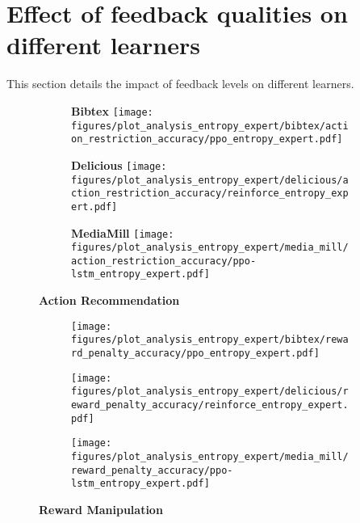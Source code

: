 
\section{Effect of feedback qualities on different learners}
\label{sec:app_expert_quality_perf}

This section details the impact of feedback levels on different learners.
\begin{figure}[!thb]
    \centering
    
    \begin{subfigure}[b]{0.3\columnwidth}
        \centering
        \setlength{\fboxsep}{1pt}\colorbox{lightgray!30}{\textbf{Bibtex}}
        \texttt{[image: figures/plot\_analysis\_entropy\_expert/bibtex/action\_restriction\_accuracy/ppo\_entropy\_expert.pdf]}
     
    \end{subfigure}
    \hfill
    \begin{subfigure}[b]{0.3\columnwidth}
        \centering
        \setlength{\fboxsep}{1pt}\colorbox{lightgray!30}{\textbf{Delicious}}
        \texttt{[image: figures/plot\_analysis\_entropy\_expert/delicious/action\_restriction\_accuracy/reinforce\_entropy\_expert.pdf]}
       
    \end{subfigure}
    \hfill
    \begin{subfigure}[b]{0.3\columnwidth}
        \centering
        \setlength{\fboxsep}{1pt}\colorbox{lightgray!30}{\textbf{MediaMill}}
        \texttt{[image: figures/plot\_analysis\_entropy\_expert/media\_mill/action\_restriction\_accuracy/ppo-lstm\_entropy\_expert.pdf]}
       
    \end{subfigure}
    \setlength{\fboxsep}{1pt}\colorbox{lightgray!30}{\textbf{Action Recommendation}}
    \vspace{1em} %
    
    \begin{subfigure}[b]{0.3\columnwidth}
        \centering
        \texttt{[image: figures/plot\_analysis\_entropy\_expert/bibtex/reward\_penalty\_accuracy/ppo\_entropy\_expert.pdf]}
    \end{subfigure}
    \hfill
    \begin{subfigure}[b]{0.3\columnwidth}
        \centering
        \texttt{[image: figures/plot\_analysis\_entropy\_expert/delicious/reward\_penalty\_accuracy/reinforce\_entropy\_expert.pdf]}
    \end{subfigure}
    \hfill
    \begin{subfigure}[b]{0.3\columnwidth}
        \centering
        \texttt{[image: figures/plot\_analysis\_entropy\_expert/media\_mill/reward\_penalty\_accuracy/ppo-lstm\_entropy\_expert.pdf]}
    \end{subfigure}
    \setlength{\fboxsep}{1pt}\colorbox{lightgray!30}{\textbf{Reward Manipulation}}
    

\end{figure}
